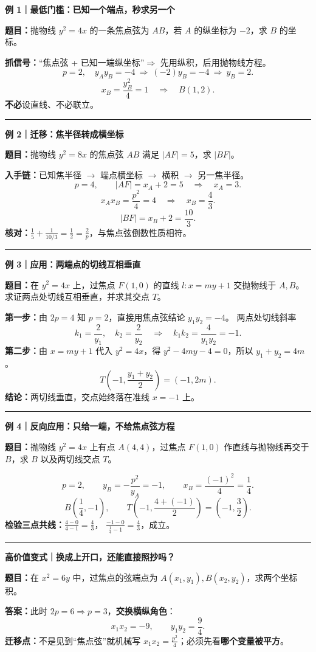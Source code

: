 \begin{examplebox}
\textbf{\textcolor{CExample}{例 1｜最低门槛：已知一个端点，秒求另一个}}\par\smallskip
\textbf{题目：}抛物线 $y^2=4x$ 的一条焦点弦为 $AB$，若 $A$ 的纵坐标为 $-2$，求 $B$ 的坐标。\par\smallskip
\textbf{抓信号：}“焦点弦 + 已知一端纵坐标”$\Rightarrow$ 先用纵积，后用抛物线方程。
\[
 p=2,\quad y_Ay_B=-4
 \ \Longrightarrow\ (-2)y_B=-4
 \ \Longrightarrow\ y_B=2.
\]
\[
 x_B=\frac{y_B^2}{4}=1
 \quad\Longrightarrow\quad \boxed{B(1,2)}.
\]
\textbf{不必}设直线、不必联立。

\medskip\hrule\medskip
\textbf{\textcolor{CExample}{例 2｜迁移：焦半径转成横坐标}}\par\smallskip
\textbf{题目：}抛物线 $y^2=8x$ 的焦点弦 $AB$ 满足 $|AF|=5$，求 $|BF|$。\par\smallskip
\textbf{入手链：}已知焦半径 $\to$ 端点横坐标 $\to$ 横积 $\to$ 另一焦半径。
\[
 p=4,\qquad |AF|=x_A+2=5
 \quad\Longrightarrow\quad x_A=3.
\]
\[
 x_Ax_B=\frac{p^2}{4}=4
 \quad\Longrightarrow\quad x_B=\frac43.
\]
\[
 \boxed{|BF|=x_B+2=\frac{10}{3}}.
\]
\textbf{核对：}$\frac1{5}+\frac1{10/3}=\frac12=\frac2p$，与焦点弦倒数性质相符。

\medskip\hrule\medskip
\textbf{\textcolor{CExample}{例 3｜应用：两端点的切线互相垂直}}\par\smallskip
\textbf{题目：}在 $y^2=4x$ 上，过焦点 $F(1,0)$ 的直线
$l:x=my+1$ 交抛物线于 $A,B$。求证两点处切线互相垂直，并求其交点 $T$。\par\smallskip
\textbf{第一步：}由 $2p=4$ 知 $p=2$，直接用焦点弦结论 $y_1y_2=-4$。
两点处切线斜率
\[
 k_1=\frac2{y_1},\quad k_2=\frac2{y_2}
 \quad\Longrightarrow\quad
 \boxed{k_1k_2=\frac4{y_1y_2}=-1}.
\]
\textbf{第二步：}由 $x=my+1$ 代入 $y^2=4x$，得
$y^2-4my-4=0$，所以 $y_1+y_2=4m$。
\[
 \boxed{T\!\left(-1,\frac{y_1+y_2}{2}\right)=(-1,2m)}.
\]
\textbf{结论：}两切线垂直，交点始终落在准线 $x=-1$ 上。

\medskip\hrule\medskip
\textbf{\textcolor{CExample}{例 4｜反向应用：只给一端，不给焦点弦方程}}\par\smallskip
\textbf{题目：}抛物线 $y^2=4x$ 上有点 $A(4,4)$，过焦点 $F(1,0)$ 作直线与抛物线再交于 $B$，求 $B$ 以及两切线交点 $T$。\par\smallskip
\[
 p=2,\qquad y_B=-\frac{p^2}{y_A}=-1,\qquad
 x_B=\frac{(-1)^2}{4}=\frac14.
\]
\[
 \boxed{B\!\left(\frac14,-1\right)},\qquad
 \boxed{T\!\left(-1,\frac{4+(-1)}{2}\right)=\left(-1,\frac32\right)}.
\]
\textbf{检验三点共线：}$\frac{4-0}{4-1}=\frac43$，
$\frac{-1-0}{\frac14-1}=\frac43$，成立。

\medskip\hrule\medskip
\textbf{\textcolor{CExample}{高价值变式｜换成上开口，还能直接照抄吗？}}\par\smallskip
\textbf{题目：}在 $x^2=6y$ 中，过焦点的弦端点为 $A(x_1,y_1),B(x_2,y_2)$，求两个坐标积。\par\smallskip
\textbf{答案：}此时 $2p=6\Rightarrow p=3$，\textbf{交换横纵角色}：
\[
 \boxed{x_1x_2=-9},\qquad
 \boxed{y_1y_2=\frac94}.
\]
\textbf{迁移点：}不是见到“焦点弦”就机械写 $x_1x_2=\frac{p^2}{4}$；必须先看\textbf{哪个变量被平方}。
\end{examplebox}
